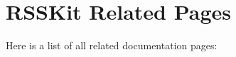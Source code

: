 \section{RSSKit Related Pages}
Here is a list of all related documentation pages:\begin{CompactList}
\item {}

\end{CompactList}
